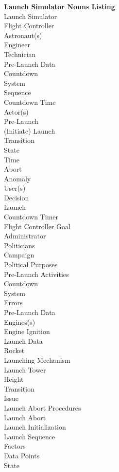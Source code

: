 \documentclass[letterpaper]{article}
\begin{document}
\noindent
\textbf{Launch Simulator Nouns Listing}\\
Launch Simulator\\
Flight Controller\\
Astronaut(s)\\
Engineer\\
Technician\\
Pre-Launch Data\\
Countdown\\
System\\
Sequence\\
Countdown Time\\
Actor(s)\\
Pre-Launch\\
(Initiate) Launch\\
Transition\\
State\\
Time\\
Abort\\
Anomaly\\
User(s)\\
Decision\\
Launch\\
Countdown Timer\\
Flight Controller Goal\\
Administrator\\
Politicians\\
Campaign\\
Political Purposes\\
Pre-Launch Activities\\
Countdown\\
System\\
Errors\\
Pre-Launch Data\\
Engines(s)\\
Engine Ignition\\
Launch Data\\
Rocket\\
Launching Mechanism\\
Launch Tower\\
Height\\
Transition\\
Issue\\
Launch Abort Procedures\\
Launch Abort\\
Launch Initialization\\
Launch Sequence\\
Factors\\
Data Points\\
State\\
\end{document}
